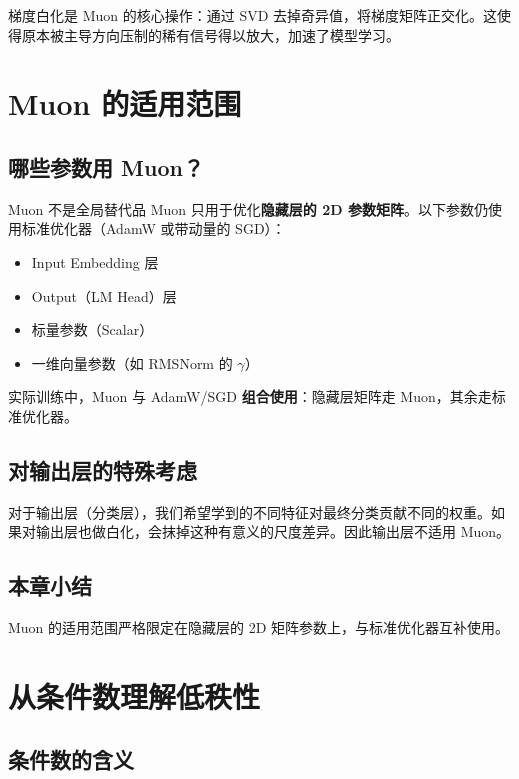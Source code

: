 \documentclass[a4paper]{article}
\begin{document}
梯度白化是 Muon 的核心操作：通过 SVD 去掉奇异值，将梯度矩阵正交化。这使得原本被主导方向压制的稀有信号得以放大，加速了模型学习。

\section{Muon 的适用范围}

\subsection{哪些参数用 Muon？}

\begin{warningbox}{Muon 不是全局替代品}
Muon 只用于优化\textbf{隐藏层的 2D 参数矩阵}。以下参数仍使用标准优化器（AdamW 或带动量的 SGD）：
\begin{itemize}
  \item Input Embedding 层
  \item Output（LM Head）层
  \item 标量参数（Scalar）
  \item 一维向量参数（如 RMSNorm 的 $\gamma$）
\end{itemize}
\end{warningbox}

实际训练中，Muon 与 AdamW/SGD \textbf{组合使用}：隐藏层矩阵走 Muon，其余走标准优化器。

\subsection{对输出层的特殊考虑}

对于输出层（分类层），我们希望学到的不同特征对最终分类贡献不同的权重。如果对输出层也做白化，会抹掉这种有意义的尺度差异。因此输出层不适用 Muon。

\subsection{本章小结}

Muon 的适用范围严格限定在隐藏层的 2D 矩阵参数上，与标准优化器互补使用。

\section{从条件数理解低秩性}

\subsection{条件数的含义}
\end{document}
